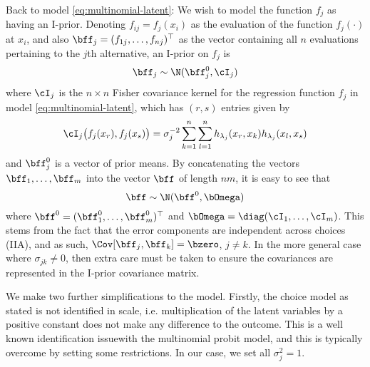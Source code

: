 Back to model \eqref{eq:multinomial-latent}: We wish to model the function $f_j$ as having an I-prior. Denoting $f_{ij} = f_j(x_i)$ as the evaluation of the function $f_j(\cdot)$ at $x_i$, and also $\bff_j = (f_{1j}, \dots, f_{nj})^\top$ as the vector containing all $n$ evaluations pertaining to the $j$th alternative, an I-prior on $f_j$ is 
\[
  \bff_j \sim \N(\bff_j^0, \cI_j)
\]
where $\cI_j$ is the $n \times n$ Fisher covariance kernel for the regression function $f_j$ in model \eqref{eq:multinomial-latent}, which has $(r,s)$ entries given by
\[
  \cI_j\big( f_j(x_r), f_j(x_s) \big) = \sigma_j^{-2} \sum_{k=1}^n \sum_{l=1}^n  h_{\lambda_j}(x_r, x_k) h_{\lambda_j}(x_l, x_s)
\]
and $\bff_j^0$ is a vector of prior means. By concatenating the vectors $\bff_1, \dots, \bff_m$ into the vector $\bff$ of length $nm$, it is easy to see that 
\[
  \bff \sim \N(\bff^0, \bOmega)
\]
where $\bff^0 = (\bff_1^0, \dots, \bff_m^0)^\top$ and $\bOmega = \diag(\cI_1, \dots, \cI_m)$. This stems from the fact that the error components are independent across choices (IIA), and as such, $\Cov[\bff_j, \bff_k] = \bzero$, $j \neq k$. In the more general case where $\sigma_{jk} \neq 0$, then extra care must be taken to ensure the covariances are represented in the I-prior covariance matrix.

We make two further simplifications to the model. Firstly, the choice model as stated is not identified in scale, i.e. multiplication of the latent variables by a positive constant does not make any difference to the outcome. This is a well known identification issue\footnotemark with the multinomial probit model, and this is typically overcome by setting some restrictions. In our case, we set all $\sigma_j^2 = 1$.


